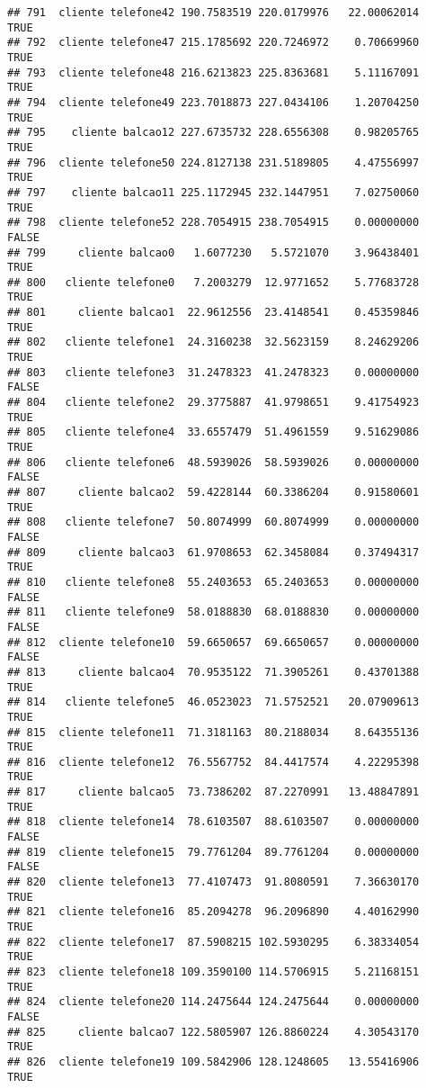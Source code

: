 \documentclass[
]{article}
\begin{document}
\begin{verbatim}
## 791  cliente telefone42 190.7583519 220.0179976   22.00062014     TRUE
## 792  cliente telefone47 215.1785692 220.7246972    0.70669960     TRUE
## 793  cliente telefone48 216.6213823 225.8363681    5.11167091     TRUE
## 794  cliente telefone49 223.7018873 227.0434106    1.20704250     TRUE
## 795    cliente balcao12 227.6735732 228.6556308    0.98205765     TRUE
## 796  cliente telefone50 224.8127138 231.5189805    4.47556997     TRUE
## 797    cliente balcao11 225.1172945 232.1447951    7.02750060     TRUE
## 798  cliente telefone52 228.7054915 238.7054915    0.00000000    FALSE
## 799     cliente balcao0   1.6077230   5.5721070    3.96438401     TRUE
## 800   cliente telefone0   7.2003279  12.9771652    5.77683728     TRUE
## 801     cliente balcao1  22.9612556  23.4148541    0.45359846     TRUE
## 802   cliente telefone1  24.3160238  32.5623159    8.24629206     TRUE
## 803   cliente telefone3  31.2478323  41.2478323    0.00000000    FALSE
## 804   cliente telefone2  29.3775887  41.9798651    9.41754923     TRUE
## 805   cliente telefone4  33.6557479  51.4961559    9.51629086     TRUE
## 806   cliente telefone6  48.5939026  58.5939026    0.00000000    FALSE
## 807     cliente balcao2  59.4228144  60.3386204    0.91580601     TRUE
## 808   cliente telefone7  50.8074999  60.8074999    0.00000000    FALSE
## 809     cliente balcao3  61.9708653  62.3458084    0.37494317     TRUE
## 810   cliente telefone8  55.2403653  65.2403653    0.00000000    FALSE
## 811   cliente telefone9  58.0188830  68.0188830    0.00000000    FALSE
## 812  cliente telefone10  59.6650657  69.6650657    0.00000000    FALSE
## 813     cliente balcao4  70.9535122  71.3905261    0.43701388     TRUE
## 814   cliente telefone5  46.0523023  71.5752521   20.07909613     TRUE
## 815  cliente telefone11  71.3181163  80.2188034    8.64355136     TRUE
## 816  cliente telefone12  76.5567752  84.4417574    4.22295398     TRUE
## 817     cliente balcao5  73.7386202  87.2270991   13.48847891     TRUE
## 818  cliente telefone14  78.6103507  88.6103507    0.00000000    FALSE
## 819  cliente telefone15  79.7761204  89.7761204    0.00000000    FALSE
## 820  cliente telefone13  77.4107473  91.8080591    7.36630170     TRUE
## 821  cliente telefone16  85.2094278  96.2096890    4.40162990     TRUE
## 822  cliente telefone17  87.5908215 102.5930295    6.38334054     TRUE
## 823  cliente telefone18 109.3590100 114.5706915    5.21168151     TRUE
## 824  cliente telefone20 114.2475644 124.2475644    0.00000000    FALSE
## 825     cliente balcao7 122.5805907 126.8860224    4.30543170     TRUE
## 826  cliente telefone19 109.5842906 128.1248605   13.55416906     TRUE

\end{verbatim}
\end{document}
